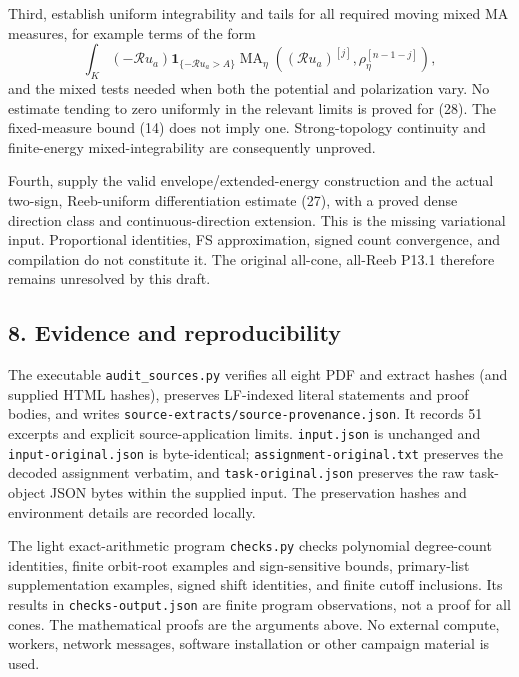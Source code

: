 \documentclass[
  11pt,
]{article}
\begin{document}
Third, establish uniform integrability and tails for all required moving
mixed MA measures, for example terms of the form \[
 \int_K(-\mathcal R u_a)\mathbf1_{\{-\mathcal R u_a>A\}}
 \operatorname{MA}_\eta((\mathcal R u_a)^{[j]},
                                     \rho_\eta^{[n-1-j]}),
 \tag{28}
\] and the mixed tests needed when both the potential and polarization
vary. No estimate tending to zero uniformly in the relevant limits is
proved for (28). The fixed-measure bound (14) does not imply one.
Strong-topology continuity and finite-energy mixed-integrability are
consequently unproved.

Fourth, supply the valid envelope/extended-energy construction and the
actual two-sign, Reeb-uniform differentiation estimate (27), with a
proved dense direction class and continuous-direction extension. This is
the missing variational input. Proportional identities, FS
approximation, signed count convergence, and compilation do not
constitute it. The original all-cone, all-Reeb P13.1 therefore remains
unresolved by this draft.

\subsection{8. Evidence and
reproducibility}\label{evidence-and-reproducibility}

The executable \texttt{audit\_sources.py} verifies all eight PDF and
extract hashes (and supplied HTML hashes), preserves LF-indexed literal
statements and proof bodies, and writes
\texttt{source-extracts/source-provenance.json}. It records 51 excerpts
and explicit source-application limits. \texttt{input.json} is unchanged
and \texttt{input-original.json} is byte-identical;
\texttt{assignment-original.txt} preserves the decoded assignment
verbatim, and \texttt{task-original.json} preserves the raw task-object
JSON bytes within the supplied input. The preservation hashes and
environment details are recorded locally.

The light exact-arithmetic program \texttt{checks.py} checks polynomial
degree-count identities, finite orbit-root examples and sign-sensitive
bounds, primary-list supplementation examples, signed shift identities,
and finite cutoff inclusions. Its results in \texttt{checks-output.json}
are finite program observations, not a proof for all cones. The
mathematical proofs are the arguments above. No external compute,
workers, network messages, software installation or other campaign
material is used.
\end{document}

